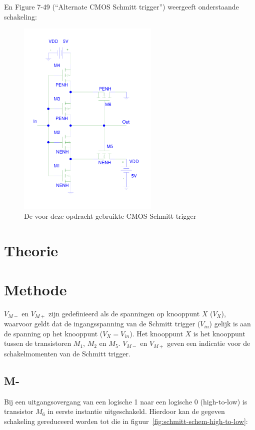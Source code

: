 \documentclass{scrartcl}  %
\begin{document}
En Figure 7-49 (``Alternate CMOS Schmitt trigger'') weergeeft onderstaande schakeling:
\begin{figure}[H]
\centering
	\includegraphics[width=0.6\textwidth]{resource/schmitt-rc.pdf}
	\caption{De voor deze opdracht gebruikte CMOS Schmitt trigger}
	\label{fig:schmitt-schem}
\end{figure}

\section{Theorie}
\label{sec:trig-theorie}


\section{Methode}
\label{sec:trig-methode}
$V_{M-}$ en $V_{M+}$ zijn gedefinieerd als de spanningen op knooppunt $X$ ($V_{X}$), waarvoor geldt dat de ingangsspanning van de Schmitt trigger ($V_{in}$) gelijk is aan de spanning op het knooppunt ($V_{X} = V_{in}$). Het knooppunt $X$ is het knooppunt tussen de transistoren $M_{1}$, $M_{2}$ en $M_{5}$. $V_{M-}$ en $V_{M+}$ geven een indicatie voor de schakelmomenten van de Schmitt trigger.

\subsection{M-}
\label{subsec:trig-methode-mminus}
Bij een uitgangsovergang van een logische 1 naar een logische 0 (high-to-low) is transistor $M_{6}$ in eerste instantie uitgeschakeld. Hierdoor kan de gegeven schakeling gereduceerd worden tot die in figuur~\ref{fig:schmitt-schem-high-to-low}:
\end{document}

